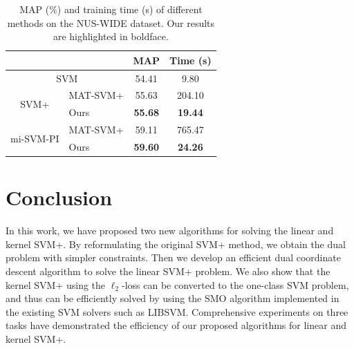 \begin{table}[t]
\caption{ MAP (\%) and training time (s) of different methods on the NUS-WIDE dataset. Our results are highlighted in boldface.}
\label{tab:nuswide}
\centering
\begin{tabular}{|c|l||c|c|}
\hline
\multicolumn{2}{|c||}{}& MAP & Time (s)\\
\hline
\multicolumn{2}{|c||}{SVM} & 54.41& 9.80\\
\hline
\multirow{2}{*}{SVM+} & MAT-SVM+ & 55.63 & 204.10\\
& Ours & \textbf{55.68} & \textbf{19.44} \\
\hline
\multirow{2}{*}{mi-SVM-PI} & MAT-SVM+ & 59.11 & 765.47\\
& Ours & \textbf{59.60}& \textbf{24.26} \\
\hline
\end{tabular}
\end{table}

\section{Conclusion}
In this work, we have proposed two new algorithms for solving the
linear and kernel SVM+. By reformulating the original SVM+ method, we
obtain the dual problem with simpler constraints. Then we develop an
efficient dual coordinate descent algorithm to solve the linear SVM+
problem. We also show that the kernel SVM+ using the $\ell_2$-loss can
be converted to the one-class SVM problem, and thus can be efficiently
solved by using the SMO algorithm implemented in the existing SVM
solvers such as LIBSVM.  Comprehensive experiments on three tasks have
demonstrated the efficiency of our proposed algorithms for linear and
kernel SVM+.

%
%
%
%
%
